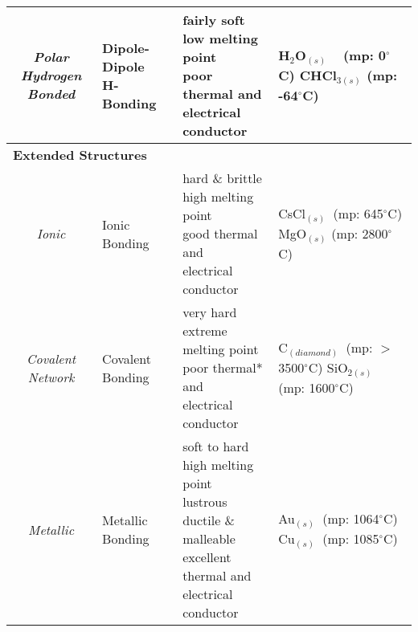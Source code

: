 \documentclass{article}
\begin{document}
\begin{qq}
\begin{center}
\begin{tabular}{clll}
			\makecell[c]{\textit{Polar}                                                                                   \\ \textit{Hydrogen Bonded}}& \makecell{Dipole-Dipole \\ H-Bonding} & \makecell[l]{fairly soft \\ low melting point \\ poor thermal and \\ electrical conductor} &  \makecell[l]{ H$_2$O$_{(s)}$ \textcolor{pag!60}{$\:\:\:\:$(mp: 0$^{\circ}$C)} \\ CHCl$_{3(s)}$ \textcolor{pag!60}{(mp: -64$^{\circ}$C)} }	\TBstrutsolids \\
			\hline
			\multicolumn{4}{l}{\textbf{Extended Structures}}\TBstrutsolidstwo                                             \\
			\hline
			\textit{Ionic}            & Ionic Bonding       & \makecell[l]{hard \& brittle                                \\ high melting point\\ good thermal and \\ electrical conductor} &  \makecell[l]{ CsCl$_{(s)}$ $\:$\textcolor{pag!60}{(mp: 645$^{\circ}$C)} \\ MgO$_{(s)}$ \textcolor{pag!60}{(mp: 2800$^{\circ}$C)} }	\TBstrutsolids \\

			\textit{Covalent Network} & Covalent Bonding    & \makecell[l]{very hard                                      \\ extreme melting point\\ poor thermal* and \\ electrical conductor} &  \makecell[l]{ C$_{(diamond)}$ $\:$\textcolor{pag!60}{(mp: $>$3500$^{\circ}$C)} \\ SiO$_{2(s)}$ $\:\:\:\:\:\:\:$\textcolor{pag!60}{(mp:  1600$^{\circ}$C)} }	\TBstrutsolids \\

			\textit{Metallic}         & Metallic Bonding    & \makecell[l]{soft to hard                                   \\ high melting point\\ lustrous \\ ductile \& malleable \\ excellent thermal and \\ electrical conductor} &  \makecell[l]{ Au$_{(s)}$ $\:$\textcolor{pag!60}{(mp: 1064$^{\circ}$C)} \\ Cu$_{(s)}$ $\:$\textcolor{pag!60}{(mp:  1085$^{\circ}$C)} }	\TBstrutsolids \\
		\end{tabular}
	\end{center}

\end{qq}
\end{document}
